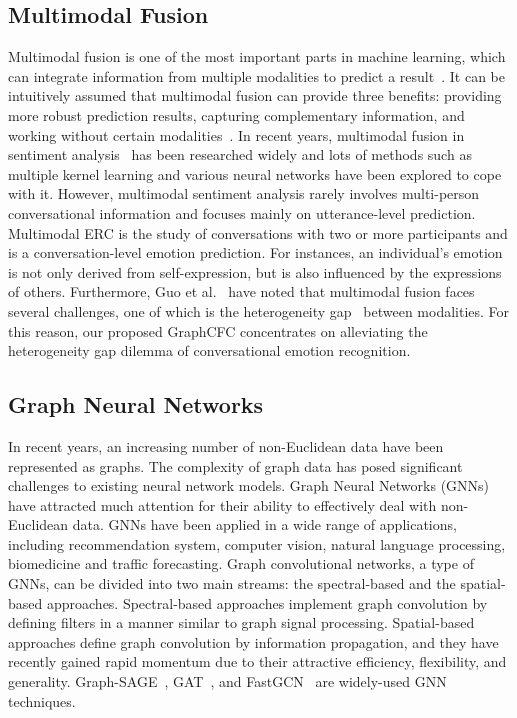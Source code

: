 \documentclass[lettersize,journal]{IEEEtran}
\begin{document}
\subsection{Multimodal Fusion}
Multimodal fusion is one of the most important parts in machine learning, which can integrate information from multiple modalities to predict a result~\cite{baltruvsaitis2018multimodal}. It can be intuitively assumed that multimodal fusion can provide three benefits: providing more robust prediction results, capturing complementary information, and working without certain modalities~\cite{d2015review}. In recent years, multimodal fusion in sentiment analysis~\cite{tsai2018learning,tsai2019multimodal,sun2020learning} has been researched widely and lots of methods such as multiple kernel learning and various neural networks have been explored to cope with it. However, multimodal sentiment analysis rarely involves multi-person conversational information and focuses mainly on utterance-level prediction. Multimodal ERC is the study of conversations with two or more participants and is a conversation-level emotion prediction. For instances, an individual's emotion is not only derived from self-expression, but is also influenced by the expressions of others. Furthermore, Guo et al.~\cite{guo2019dmrl} have noted that multimodal fusion faces several challenges, one of which is the heterogeneity gap~\cite{hazarika2020misa} between modalities. For this reason, our proposed GraphCFC concentrates on alleviating the heterogeneity gap dilemma of conversational emotion recognition.

\subsection{Graph Neural Networks}
In recent years, an increasing number of non-Euclidean data have been represented as graphs. The complexity of graph data has posed significant challenges to existing neural network models. Graph Neural Networks (GNNs) have attracted much attention for their ability to effectively deal with non-Euclidean data. GNNs have been applied in a wide range of applications, including recommendation system, computer vision, natural language processing, biomedicine and traffic forecasting. Graph convolutional networks, a type of GNNs, can be divided into two main streams: the spectral-based and the spatial-based approaches. Spectral-based approaches implement graph convolution by defining filters in a manner similar to graph signal processing. Spatial-based approaches define graph convolution by information propagation, and they have recently gained rapid momentum due to their attractive efficiency, flexibility, and generality. Graph-SAGE~\cite{hamilton2017inductive}, GAT~\cite{velickovic2017graph}, and FastGCN~\cite{chen2018fastgcn} are widely-used GNN techniques.
\end{document}
